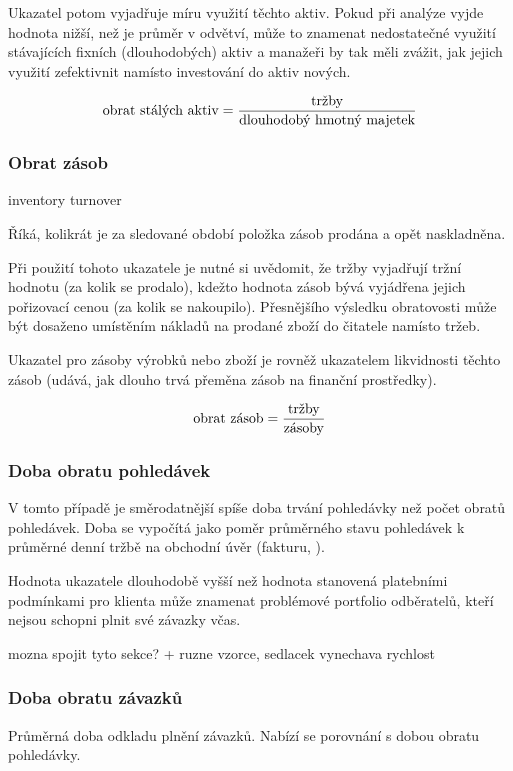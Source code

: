 Ukazatel potom vyjadřuje míru využití těchto aktiv. Pokud při analýze vyjde hodnota nižší, než je průměr v odvětví, může to znamenat nedostatečné využití stávajících fixních (dlouhodobých) aktiv a manažeři by tak měli zvážit, jak jejich využití zefektivnit namísto investování do aktiv nových.

$$\text{obrat stálých aktiv} = \dfrac{\text{tržby}}{\text{dlouhodobý hmotný majetek}}$$

\subsubsection{Obrat zásob}

inventory turnover

Říká, kolikrát je za sledované období položka zásob prodána a opět naskladněna.

Při použití tohoto ukazatele je nutné si uvědomit, že tržby vyjadřují tržní hodnotu (za kolik se prodalo), kdežto hodnota zásob bývá vyjádřena jejich pořizovací cenou (za kolik se nakoupilo). Přesnějšího výsledku obratovosti může být dosaženo umístěním nákladů na prodané zboží do čitatele namísto tržeb.

Ukazatel pro zásoby výrobků nebo zboží je rovněž ukazatelem likvidnosti těchto zásob (udává, jak dlouho trvá přeměna zásob na finanční prostředky).

$$\text{obrat zásob} = \dfrac{\text{tržby}}{\text{zásoby}}$$


\subsubsection{Doba obratu pohledávek}
V tomto případě je směrodatnější spíše doba trvání pohledávky než počet obratů pohledávek. Doba se vypočítá jako poměr průměrného stavu pohledávek k průměrné denní tržbě na obchodní úvěr (fakturu, ).

Hodnota ukazatele dlouhodobě vyšší než hodnota stanovená platebními podmínkami pro klienta může znamenat problémové portfolio odběratelů, kteří nejsou schopni plnit své závazky včas.

mozna spojit tyto sekce? + ruzne vzorce, sedlacek vynechava rychlost

\subsubsection{Doba obratu závazků}
Průměrná doba odkladu plnění závazků. Nabízí se porovnání s dobou obratu pohledávky. 





